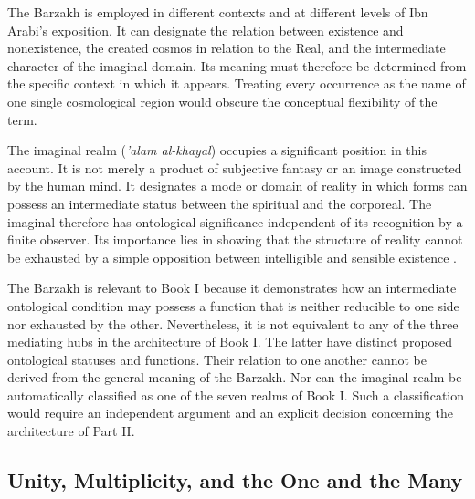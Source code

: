 \label{para:VS.B01.P01.C08.SS10.P002}

The Barzakh is employed in different contexts and
at different levels of Ibn Arabi's exposition.
It can designate the relation between existence
and nonexistence, the created cosmos in relation
to the Real, and the intermediate character of
the imaginal domain. Its meaning must therefore
be determined from the specific context in which
it appears. Treating every occurrence as the name
of one single cosmological region would obscure
the conceptual flexibility of the term.

\label{para:VS.B01.P01.C08.SS10.P003}

The imaginal realm (\textit{'alam al-khayal})
occupies a significant position in this account.
It is not merely a product of subjective fantasy
or an image constructed by the human mind. It
designates a mode or domain of reality in which
forms can possess an intermediate status between
the spiritual and the corporeal. The imaginal
therefore has ontological significance independent
of its recognition by a finite observer. Its
importance lies in showing that the structure
of reality cannot be exhausted by a simple
opposition between intelligible and sensible
existence \citep{ChittickSufiPathKnowledge1989}.

\label{para:VS.B01.P01.C08.S16.SS10.P004}

The Barzakh is relevant to Book I because it
demonstrates how an intermediate ontological
condition may possess a function that is neither
reducible to one side nor exhausted by the other.
Nevertheless, it is not equivalent to any of the
three mediating hubs in the architecture of Book I.
The latter have distinct proposed ontological
statuses and functions. Their relation to one
another cannot be derived from the general
meaning of the Barzakh. Nor can the imaginal realm
be automatically classified as one of the seven
realms of Book I. Such a classification would
require an independent argument and an explicit
decision concerning the architecture of Part II.



\subsection{Unity, Multiplicity, and the One and the Many}
\label{subsec:ch08_s16_ss11}

